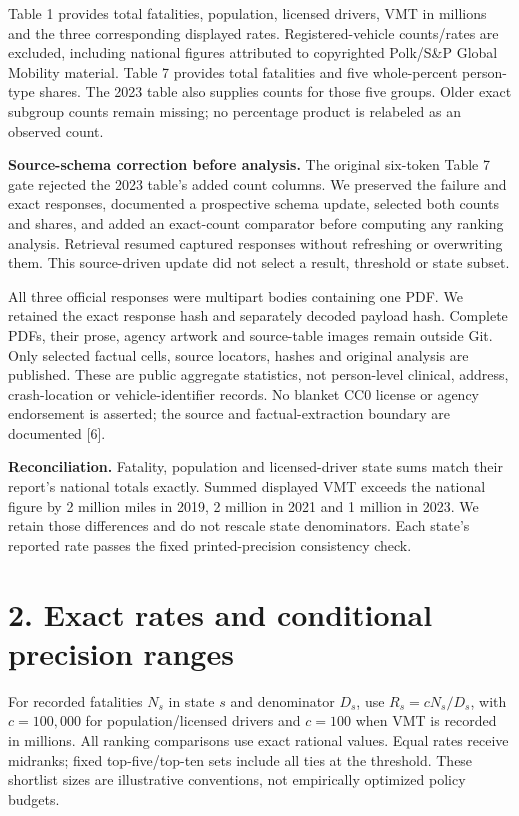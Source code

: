 \documentclass[10pt,letterpaper]{article}
\begin{document}
Table 1 provides total fatalities, population, licensed drivers, VMT in millions and the three corresponding displayed rates. Registered-vehicle counts/rates are excluded, including national figures attributed to copyrighted Polk/S\&P Global Mobility material. Table 7 provides total fatalities and five whole-percent person-type shares. The 2023 table also supplies counts for those five groups. Older exact subgroup counts remain missing; no percentage product is relabeled as an observed count.

\textbf{Source-schema correction before analysis.} The original six-token Table 7 gate rejected the 2023 table's added count columns. We preserved the failure and exact responses, documented a prospective schema update, selected both counts and shares, and added an exact-count comparator before computing any ranking analysis. Retrieval resumed captured responses without refreshing or overwriting them. This source-driven update did not select a result, threshold or state subset.

All three official responses were multipart bodies containing one PDF. We retained the exact response hash and separately decoded payload hash. Complete PDFs, their prose, agency artwork and source-table images remain outside Git. Only selected factual cells, source locators, hashes and original analysis are published. These are public aggregate statistics, not person-level clinical, address, crash-location or vehicle-identifier records. No blanket CC0 license or agency endorsement is asserted; the source and factual-extraction boundary are documented [6].

\textbf{Reconciliation.} Fatality, population and licensed-driver state sums match their report's national totals exactly. Summed displayed VMT exceeds the national figure by 2 million miles in 2019, 2 million in 2021 and 1 million in 2023. We retain those differences and do not rescale state denominators. Each state's reported rate passes the fixed printed-precision consistency check.

\clearpage
\section*{2. Exact rates and conditional precision ranges}
For recorded fatalities $N_s$ in state $s$ and denominator $D_s$, use $R_s=cN_s/D_s$, with $c=100{,}000$ for population/licensed drivers and $c=100$ when VMT is recorded in millions. All ranking comparisons use exact rational values. Equal rates receive midranks; fixed top-five/top-ten sets include all ties at the threshold. These shortlist sizes are illustrative conventions, not empirically optimized policy budgets.
\end{document}
